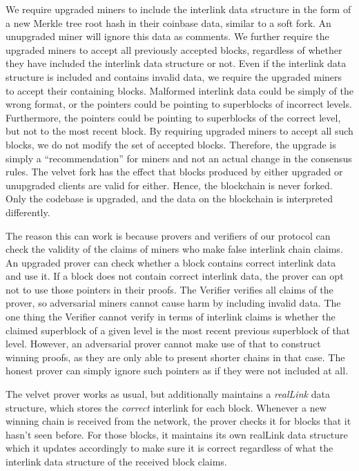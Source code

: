 We require upgraded miners to include the interlink data structure in the form
of a new Merkle tree root hash in their coinbase data, similar to a soft fork.
An unupgraded miner will ignore this data as comments. We further require the
upgraded miners to accept all previously accepted blocks, regardless of whether
they have included the interlink data structure or not. Even if the interlink
data structure is included and contains invalid data, we require the upgraded
miners to accept their containing blocks. Malformed interlink data could be
simply of the wrong format, or the pointers could be pointing to superblocks of
incorrect levels. Furthermore, the pointers could be pointing to superblocks of
the correct level, but not to the most recent block. By requiring upgraded
miners to accept all such blocks, we do not modify the set of accepted blocks.
Therefore, the upgrade is simply a ``recommendation'' for miners and not an
actual change in the consensus rules. The velvet fork has the effect that blocks
produced by either upgraded or unupgraded clients are valid for either. Hence,
the blockchain is never forked. Only the codebase is upgraded, and the  data on
the blockchain is interpreted differently.

The reason this can work is because provers and verifiers of our protocol can
check the validity of the claims of miners who make false interlink chain
claims. An upgraded prover can check whether a block contains correct interlink
data and use it. If a block does not contain correct interlink data, the prover
can opt not to use those pointers in their proofs. The Verifier verifies all
claims of the prover, so adversarial miners cannot cause harm by including
invalid data. The one thing the Verifier cannot verify in terms of interlink
claims is whether the claimed superblock of a given level is the most recent
previous superblock of that level. However, an adversarial prover cannot make
use of that to construct winning proofs, as they are only able to present
shorter chains in that case. The honest prover can simply ignore such pointers
as if they were not included at all.

The velvet prover works as usual, but additionally maintains a \textit{realLink}
data structure, which stores the \textit{correct} interlink for each block.
Whenever a new winning chain is received from the network, the prover checks it
for blocks that it hasn't seen before. For those blocks, it maintains its own
realLink data structure which it updates accordingly to make sure it is correct
regardless of what the interlink data structure of the received block claims.

